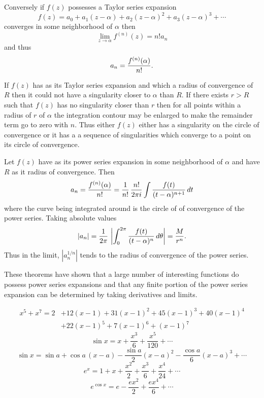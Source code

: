 Conversely if $f(z)$ possesses a Taylor series expansion 
\begin{equation}
f(z) = a_0 + a_1(z - \alpha) + a_2(z - \alpha)^2 + 
a_3(z - \alpha)^3 + \cdots
\label{Taylor:Series:Def:Eq}
\end{equation}
converges in some neighborhood of $\alpha$ then 
\[
\lim_{z \rightarrow \alpha} f^{(n)}(z) = n! a_n
\]
and thus
\[
a_n = {f^{(n)}(\alpha) \over n!}.
\]

If $f(z)$ has 
 as its Taylor series expansion and which 
a radius of convergence of $R$ then it could not have a singularity
closer to $\alpha$ than $R$.  If there exists $r > R$ such
that $f(z)$ has no singularity closer than $r$ then for all points
within a radius of $r$ of $\alpha$ the integration contour may be enlarged to
make the remainder term go to zero with $n$.  Thus either $f(z)$ either has
a singularity on the circle of convergence or it has a a sequence of
singularities which converge to a point on its circle of convergence.

Let $f(z)$ have  as its power series
expansion in some neighborhood of $\alpha$ and have $R$ as it radius
of convergence.  Then  
\[
a_n = {f^{(n)}(\alpha) \over n!} 
  = {1 \over n!} \, {n! \over 2 \pi i} 
    \int {f(t) \over (t - \alpha)^{n+1}} \, dt
\]
where the curve being integrated around is the circle of of convergence of
the power series.  Taking absolute values \
\[
|a_n | = {1 \over 2 \pi}\,
\left|\int^{2 \pi}_0 {f(t) \over (t - \alpha)^n}\, d\theta \right|
= {M \over r^n}.
\]
Thus in the limit, $|a_n^{1/n}|$ tends to the radius of
convergence of the power series.

These theorems have shown that a large number of interesting functions
do possess power series expansions and that any finite portion of the 
power series expansion can be determined by taking derivatives and limits.

\[
\begin {aligned}
x^5 + x^7 = 2 &+ 12 (x-1) + 31 (x-1)^2 + 45(x-1)^3 + 40 (x-1)^4 \\
  & + 22(x-1)^5 + 7(x-1)^6 + (x-1)^7
\end{aligned}
\]
\[
\sin x = x + \frac{x^3}{6} + \frac{x^5}{120} + \cdots
\]
\[
\sin x = \sin a + \cos a\, (x - a) - \frac{\sin a}{2}(x-a)^2 -
\frac{\cos a}{6} (x-a)^3 + \cdots
\]
\[
e^x = 1 + x + \frac{x^2}{2} + \frac{x^3}{6} + \frac{x^4}{24} + \cdots
\]
\[
e^{\cos x} = e - \frac{ex^2}{2} + \frac{ex^4}{6} + \cdots
\]

